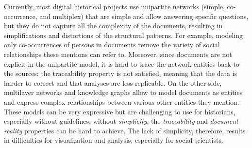 Currently, most digital historical projects use unipartite networks (simple, co-occurrence, and multiplex) that are simple and allow answering specific questions, but they do not capture all the complexity of the documents, resulting in simplifications and distortions of the structural patterns.
For example, modeling only co-occurrences of persons in documents remove the variety of social relationships these mentions can refer to\cite{lemercier12FormalNetwork2015}.
Moreover, since documents are not explicit in the unipartite model, it is hard to trace the network entities back to the sources: the traceability property is not satisfied, meaning that the data is harder to correct and that analyses are less replicable.
On the other side, multilayer networks and knowledge graphs allow to model documents as entities and express complex relationships between various other entities they mention.
These models can be very expressive but are challenging to use for historians, especially without guidelines; without \textit{simplicity}, the \textit{traceability} and \textit{document reality} properties can be hard to achieve.
The lack of simplicity, therefore, results in difficulties for visualization and analysis, especially for social scientists.






